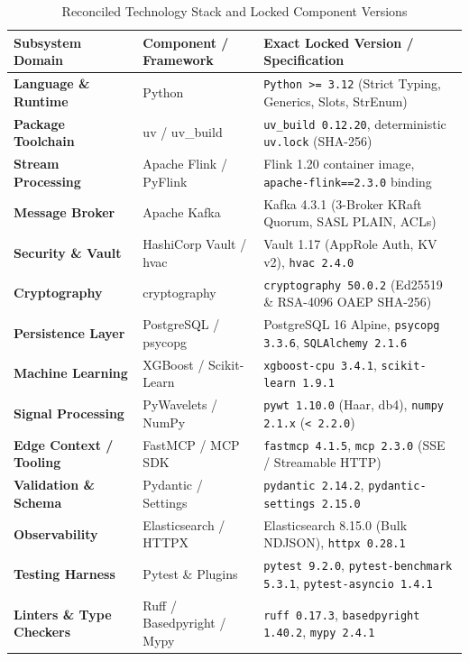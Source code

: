 \documentclass[10pt,a4paper]{report}
\begin{document}
\begin{table}[htbp]
\centering
\small
\caption{Reconciled Technology Stack and Locked Component Versions}
\label{tab:tech_stack}
\begin{tabularx}{\textwidth}{llX}
\toprule
\textbf{Subsystem Domain} & \textbf{Component / Framework} & \textbf{Exact Locked Version / Specification} \\
\midrule
\textbf{Language \& Runtime} & Python & \texttt{Python >= 3.12} (Strict Typing, Generics, Slots, StrEnum) \\
\textbf{Package Toolchain} & uv / uv\_build & \texttt{uv\_build 0.12.20}, deterministic \texttt{uv.lock} (SHA-256) \\
\textbf{Stream Processing} & Apache Flink / PyFlink & Flink 1.20 container image, \texttt{apache-flink==2.3.0} binding \\
\textbf{Message Broker} & Apache Kafka & Kafka 4.3.1 (3-Broker KRaft Quorum, SASL PLAIN, ACLs) \\
\textbf{Security \& Vault} & HashiCorp Vault / hvac & Vault 1.17 (AppRole Auth, KV v2), \texttt{hvac 2.4.0} \\
\textbf{Cryptography} & cryptography & \texttt{cryptography 50.0.2} (Ed25519 \& RSA-4096 OAEP SHA-256) \\
\textbf{Persistence Layer} & PostgreSQL / psycopg & PostgreSQL 16 Alpine, \texttt{psycopg 3.3.6}, \texttt{SQLAlchemy 2.1.6} \\
\textbf{Machine Learning} & XGBoost / Scikit-Learn & \texttt{xgboost-cpu 3.4.1}, \texttt{scikit-learn 1.9.1} \\
\textbf{Signal Processing} & PyWavelets / NumPy & \texttt{pywt 1.10.0} (Haar, db4), \texttt{numpy 2.1.x} (\texttt{< 2.2.0}) \\
\textbf{Edge Context / Tooling} & FastMCP / MCP SDK & \texttt{fastmcp 4.1.5}, \texttt{mcp 2.3.0} (SSE / Streamable HTTP) \\
\textbf{Validation \& Schema} & Pydantic / Settings & \texttt{pydantic 2.14.2}, \texttt{pydantic-settings 2.15.0} \\
\textbf{Observability} & Elasticsearch / HTTPX & Elasticsearch 8.15.0 (Bulk NDJSON), \texttt{httpx 0.28.1} \\
\textbf{Testing Harness} & Pytest \& Plugins & \texttt{pytest 9.2.0}, \texttt{pytest-benchmark 5.3.1}, \texttt{pytest-asyncio 1.4.1} \\
\textbf{Linters \& Type Checkers} & Ruff / Basedpyright / Mypy & \texttt{ruff 0.17.3}, \texttt{basedpyright 1.40.2}, \texttt{mypy 2.4.1} \\
\bottomrule
\end{tabularx}
\end{table}
\end{document}

